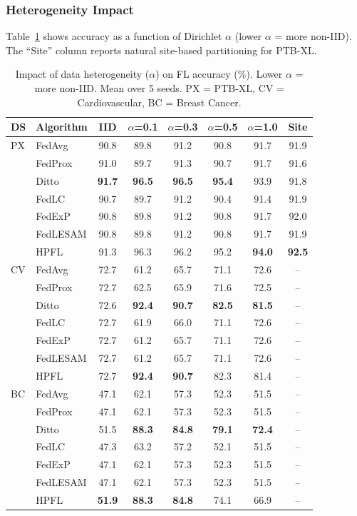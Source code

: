 \documentclass[conference]{IEEEtran}
\begin{document}
\subsubsection{Heterogeneity Impact}

Table~\ref{tab:heterogeneity} shows accuracy as a function of Dirichlet $\alpha$ (lower $\alpha$ = more non-IID). The ``Site'' column reports natural site-based partitioning for PTB-XL.

\begin{table}[t]
\centering
\caption{Impact of data heterogeneity ($\alpha$) on FL accuracy (\%). Lower $\alpha$ = more non-IID. Mean over 5 seeds. PX = PTB-XL, CV = Cardiovascular, BC = Breast Cancer.}
\label{tab:heterogeneity}
\small
\begin{tabular}{llcccccc}
\toprule
\textbf{DS} & \textbf{Algorithm} & \textbf{IID} & \textbf{$\alpha$=0.1} & \textbf{$\alpha$=0.3} & \textbf{$\alpha$=0.5} & \textbf{$\alpha$=1.0} & \textbf{Site} \\
\midrule
PX & FedAvg & 90.8 & 89.8 & 91.2 & 90.8 & 91.7 & 91.9 \\
 & FedProx & 91.0 & 89.7 & 91.3 & 90.7 & 91.7 & 91.6 \\
 & Ditto & \textbf{91.7} & \textbf{96.5} & \textbf{96.5} & \textbf{95.4} & 93.9 & 91.8 \\
 & FedLC & 90.7 & 89.7 & 91.2 & 90.4 & 91.4 & 91.9 \\
 & FedExP & 90.8 & 89.8 & 91.2 & 90.8 & 91.7 & 92.0 \\
 & FedLESAM & 90.8 & 89.8 & 91.2 & 90.8 & 91.7 & 91.9 \\
 & HPFL & 91.3 & 96.3 & 96.2 & 95.2 & \textbf{94.0} & \textbf{92.5} \\
\midrule
CV & FedAvg & 72.7 & 61.2 & 65.7 & 71.1 & 72.6 & -- \\
 & FedProx & 72.7 & 62.5 & 65.9 & 71.6 & 72.5 & -- \\
 & Ditto & 72.6 & \textbf{92.4} & \textbf{90.7} & \textbf{82.5} & \textbf{81.5} & -- \\
 & FedLC & 72.7 & 61.9 & 66.0 & 71.1 & 72.6 & -- \\
 & FedExP & 72.7 & 61.2 & 65.7 & 71.1 & 72.6 & -- \\
 & FedLESAM & 72.7 & 61.2 & 65.7 & 71.1 & 72.6 & -- \\
 & HPFL & 72.7 & \textbf{92.4} & \textbf{90.7} & 82.3 & 81.4 & -- \\
\midrule
BC & FedAvg & 47.1 & 62.1 & 57.3 & 52.3 & 51.5 & -- \\
 & FedProx & 47.1 & 62.1 & 57.3 & 52.3 & 51.5 & -- \\
 & Ditto & 51.5 & \textbf{88.3} & \textbf{84.8} & \textbf{79.1} & \textbf{72.4} & -- \\
 & FedLC & 47.3 & 63.2 & 57.2 & 52.1 & 51.5 & -- \\
 & FedExP & 47.1 & 62.1 & 57.3 & 52.3 & 51.5 & -- \\
 & FedLESAM & 47.1 & 62.1 & 57.3 & 52.3 & 51.5 & -- \\
 & HPFL & \textbf{51.9} & \textbf{88.3} & \textbf{84.8} & 74.1 & 66.9 & -- \\
\bottomrule
\end{tabular}
\end{table}
\end{document}

